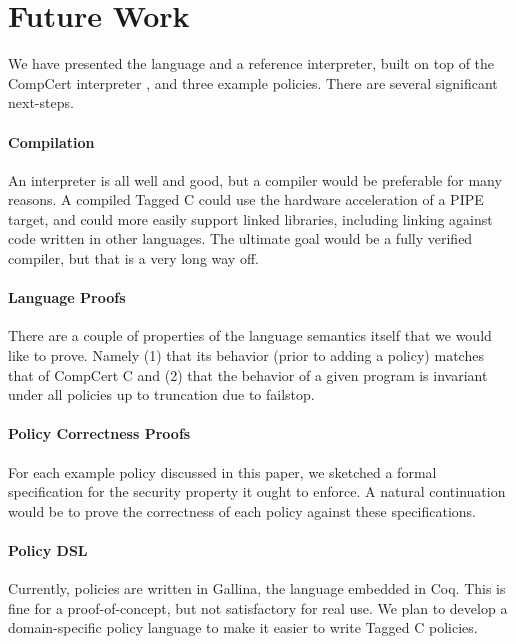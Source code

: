 \documentclass[acmsmall,review,anonymous]{acmart}\settopmatter{printfolios=true,printccs=false,printacmref=false}
\begin{document}
\section{Future Work}
\label{sec:futurework}

We have presented the language and a reference interpreter, built on top of the CompCert interpreter
\cite{Leroy09:CompCert}, and three example policies. There are several significant next-steps.

\paragraph{Compilation}

An interpreter is all well and good, but a compiler would be preferable for many reasons.
A compiled Tagged C could use the hardware acceleration of a PIPE target, and could more easily
support linked libraries, including linking against code written in other languages.
The ultimate goal would be a fully verified compiler, but that is a very long way off.

\paragraph{Language Proofs}

There are a couple of properties of the language semantics itself that we would like to prove.
Namely (1) that its behavior (prior to adding a policy) matches that of CompCert C and
(2) that the behavior of a given program is invariant under all policies up to truncation due
to failstop.

\paragraph{Policy Correctness Proofs}

For each example policy discussed in this paper, we sketched a formal specification for the
security property it ought to enforce. A natural continuation would be to prove the correctness
of each policy against these specifications.

\paragraph{Policy DSL}

Currently, policies are written in Gallina, the language embedded in Coq. This is fine for a
proof-of-concept, but not satisfactory for real use. We plan to develop a domain-specific policy
language to make it easier to write Tagged C policies.
\end{document}
